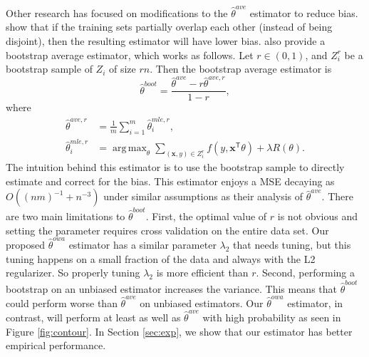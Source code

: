 \documentclass[twoside]{article}
\DeclareMathOperator*{\argmin}{arg\,min}
\DeclareMathOperator*{\argmax}{arg\,max}
\newcommand{\x}{\mathbf{x}}
\newcommand{\w}{\theta}
\newcommand{\wowa}{\hat\w^{owa}}
\newcommand{\wave}{\hat\w^{ave}}
\newcommand{\waver}{\hat\w^{ave,r}}
\newcommand{\wboot}{\hat\w^{boot}}
\newcommand{\wmle}{\hat\w^{mle}}
\newcommand{\wmler}{\hat\w^{mle,r}}
\newcommand{\trans}[1]{\ensuremath{{#1}^{\mathsf{T}}}}
\newcommand{\ltwo}[1]{{\lVert {#1} \rVert}}
\begin{document}
Other research has focused on modifications to the $\wave$ estimator to reduce bias.
\cite{zinkevich2010parallelized} show that if the training sets partially overlap each other (instead of being disjoint), then the resulting estimator will have lower bias.
\cite{zhang2012communication} also provide a bootstrap average estimator,
which works as follows.
Let $r\in(0,1)$, and $Z_i^r$ be a bootstrap sample of $Z_i$ of size $rn$.
Then the bootstrap average estimator is
\begin{equation}
\wboot = \frac{\wave-r\waver}{1-r}
,
\end{equation}
where
\begin{equation}
\begin{aligned}
\waver &= \frac{1}{m}\sum_{i=1}^m \wmler_i
,
\\
\wmler_i &= \argmax_\w \sum_{(\x,y)\in Z_i^r} f(y,\trans\x\w) + \lambda R(\w)
.
\end{aligned}
\end{equation}
The intuition behind this estimator is to use the bootstrap sample to directly estimate and correct for the bias.
This estimator enjoys a MSE decaying as $O((nm)^{-1}+n^{-3})$ under similar assumptions as their analysis of $\wave$.
There are two main limitations to $\wboot$.
First, the optimal value of $r$ is not obvious and setting the parameter requires cross validation on the entire data set.
Our proposed $\wowa$ estimator has a similar parameter $\lambda_2$ that needs tuning,
but this tuning happens on a small fraction of the data and always with the L2 regularizer.
So properly tuning $\lambda_2$ is more efficient than $r$.
Second, performing a bootstrap on an unbiased estimator increases the variance.
This means that $\wboot$ could perform worse than $\wave$ on unbiased estimators.
Our $\wowa$ estimator, in contrast, will perform at least as well as $\wave$ with high probability as seen in Figure \ref{fig:contour}.
In Section \ref{sec:exp}, we show that our estimator has better empirical performance.

\end{document}
